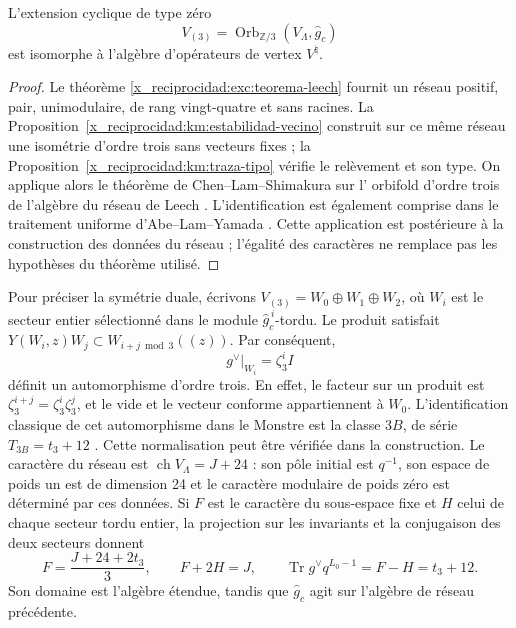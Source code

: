 \begin{theorem}
\label{x_reciprocidad:km:moonshine-tres}
L'extension cyclique de type zéro
\begin{equation}
 V_{(3)}=\operatorname{Orb}_{\mathbb Z/3}
                 (V_\Lambda,\widehat g_c)
 \label{x_reciprocidad:km:extension-orden3}
\end{equation}
est isomorphe à l'algèbre d'opérateurs de vertex \(V^\natural\).
\end{theorem}
\begin{proof}
Le théorème \ref{x_reciprocidad:exc:teorema-leech} fournit un réseau positif,
pair, unimodulaire, de rang vingt-quatre et sans racines. La
Proposition~\ref{x_reciprocidad:km:estabilidad-vecino} construit sur ce même
réseau une isométrie d'ordre trois sans vecteurs fixes ; la
Proposition~\ref{x_reciprocidad:km:traza-tipo} vérifie le relèvement et son type.
On applique alors le théorème de Chen--Lam--Shimakura sur l'
orbifold d'ordre trois de l'algèbre du réseau de Leech
\cite[Teorema~1.1]{x_reciprocidad:chenlamshimakura2016}. L'identification est également comprise
dans le traitement uniforme d'Abe--Lam--Yamada
\cite[Teorema~4.4 y secciones~2--4]{x_reciprocidad:abelamyamada2017}. Cette application est postérieure à la construction
des données du réseau ; l'égalité des caractères ne remplace pas les
hypothèses du théorème utilisé.
\end{proof}

Pour préciser la symétrie duale, écrivons \(V_{(3)}=W_0\oplus W_1\oplus W_2\), où \(W_i\) est le secteur entier sélectionné dans le module \(\widehat g_c^{\,i}\)-tordu. Le produit satisfait \(Y(W_i,z)W_j\subset W_{i+j\bmod3}((z))\). Par conséquent,
\begin{equation}
 g^\vee|_{W_i}=\zeta_3^i I
 \label{x_reciprocidad:km:dual-ciclico}
\end{equation}
définit un automorphisme d'ordre trois. En effet, le facteur sur un
produit est \(\zeta_3^{i+j}=\zeta_3^i\zeta_3^j\), et le vide et le
vecteur conforme appartiennent à \(W_0\). L'identification classique de
cet automorphisme dans le Monstre est la classe \(3B\), de série
\(T_{3B}=t_3+12\) \cite{x_reciprocidad:kmconwaynorton1979,x_reciprocidad:borcherds}.
Cette normalisation peut être vérifiée dans la construction. Le caractère
du réseau est \(\operatorname{ch}V_\Lambda=J+24\) : son pôle initial
est \(q^{-1}\), son espace de poids un est de dimension 24 et le
caractère modulaire de poids zéro est déterminé par ces données.
Si \(F\) est le caractère du sous-espace fixe et \(H\) celui de chaque
secteur tordu entier, la projection sur les invariants et la conjugaison
des deux secteurs donnent
\[
 F=\frac{J+24+2t_3}{3},\qquad F+2H=J,
 \qquad \operatorname{Tr}g^\vee q^{L_0-1}=F-H=t_3+12.
\]
Son domaine est l'algèbre étendue, tandis que \(\widehat g_c\) agit sur l'algèbre de réseau précédente.

